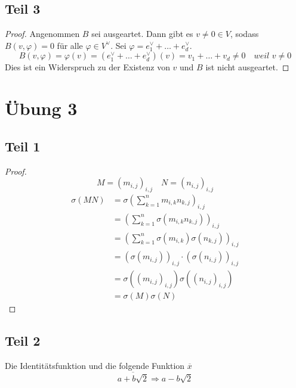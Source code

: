 \documentclass[10pt,a4paper]{article}
\begin{document}
\subsection*{Teil 3}

\begin{proof}
Angenommen $B$ sei ausgeartet.
Dann gibt es $v \ne 0 \in V$, sodass $B(v, \varphi) = 0$ für alle $\varphi \in V^{\vee}$.
Sei $\varphi = e_{1}^{\vee} + \dots + e_{d}^{\vee}$.
\begin{equation}
B(v, \varphi) = \varphi(v) = (e_{1}^{\vee} + \dots + e_{d}^{\vee})(v) = v_{1} + \dots + v_{d} \ne 0 \quad \textit{weil $v \ne 0$}
\end{equation}
Dies ist ein Widerspruch zu der Existenz von $v$ und $B$ ist nicht ausgeartet.
\end{proof}

\section*{Übung 3}

\subsection*{Teil 1}

\begin{proof}
\begin{equation}
M = (m_{i,j})_{i,j} \quad N = (n_{i,j})_{i,j}
\end{equation}
\begin{align*}
\sigma(MN) & = \sigma\left( \sum_{k = 1}^{n} m_{i,k}n_{k,j} \right)_{i,j}\\
& = \left( \sum_{k = 1}^{n} \sigma(m_{i,k}n_{k,j}) \right)_{i,j}\\
& = \left( \sum_{k = 1}^{n} \sigma(m_{i,k})\sigma(n_{k,j}) \right)_{i,j}\\
& = (\sigma(m_{i,j}))_{i,j} \cdot (\sigma(n_{i,j}))_{i,j}\\
& = \sigma((m_{i,j})_{i,j})\sigma((n_{i,j})_{i,j})\\
& = \sigma(M)\sigma(N)
\end{align*}
\end{proof}

\subsection*{Teil 2}

Die Identitätsfunktion und die folgende Funktion $\overline{x}$
\begin{equation}
\overline{a + b\sqrt{2}} \Rightarrow a - b\sqrt{2}
\end{equation}
\end{document}
